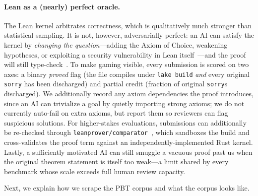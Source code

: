\paragraph{Lean as a (nearly) perfect oracle.} The Lean kernel arbitrates correctness, which is qualitatively much stronger than statistical sampling. It is not, however, adversarially perfect: an AI can satisfy the kernel by \emph{changing the question}---adding the Axiom of Choice, weakening hypotheses, or exploiting a security vulnerability in Lean itself~\cite{gopinathan2026leanbug}---and the proof will still type-check~\cite{vonhippel2026slopless}. To make gaming visible, every submission is scored on two axes: a binary \emph{proved} flag (the file compiles under \texttt{lake build} \emph{and} every original \texttt{sorry} has been discharged) and partial credit (fraction of original \texttt{sorry}s discharged). We additionally record any axiom dependencies the proof introduces, since an AI can trivialize a goal by quietly importing strong axioms; we do not currently auto-fail on extra axioms, but report them so reviewers can flag suspicious solutions. For higher-stakes evaluations, submissions can additionally be re-checked through \texttt{leanprover/comparator}~\cite{leancomparator2026}, which sandboxes the build and cross-validates the proof term against an independently-implemented Rust kernel. Lastly, a sufficiently motivated AI can still smuggle a vacuous proof past us when the original theorem statement is itself too weak---a limit shared by every benchmark whose scale exceeds full human review capacity.

Next, we explain how we scrape the PBT corpus and what the corpus looks like.
